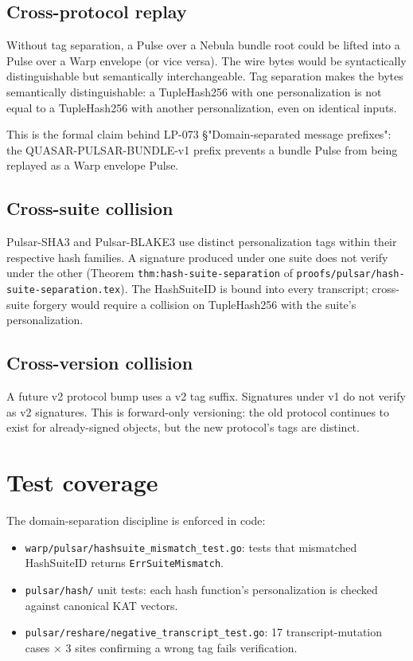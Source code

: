 \documentclass[11pt,a4paper]{article}
\begin{document}
\subsection{Cross-protocol replay}

Without tag separation, a Pulse over a Nebula bundle root could be lifted into a Pulse over a Warp envelope (or vice versa). The wire bytes would be syntactically distinguishable but semantically interchangeable. Tag separation makes the bytes semantically distinguishable: a TupleHash256 with one personalization is not equal to a TupleHash256 with another personalization, even on identical inputs.

This is the formal claim behind LP-073 \cite{luxpulsar} \S "Domain-separated message prefixes": the QUASAR-PULSAR-BUNDLE-v1 prefix prevents a bundle Pulse from being replayed as a Warp envelope Pulse.

\subsection{Cross-suite collision}

Pulsar-SHA3 and Pulsar-BLAKE3 use distinct personalization tags within their respective hash families. A signature produced under one suite does not verify under the other (Theorem \texttt{thm:hash-suite-separation} of \texttt{proofs/pulsar/hash-suite-separation.tex}). The HashSuiteID is bound into every transcript; cross-suite forgery would require a collision on TupleHash256 with the suite's personalization.

\subsection{Cross-version collision}

A future v2 protocol bump uses a v2 tag suffix. Signatures under v1 do not verify as v2 signatures. This is forward-only versioning: the old protocol continues to exist for already-signed objects, but the new protocol's tags are distinct.

\section{Test coverage}

The domain-separation discipline is enforced in code:

\begin{itemize}[leftmargin=2em,nosep]
  \item \texttt{warp/pulsar/hashsuite\_mismatch\_test.go}: tests that mismatched HashSuiteID returns \texttt{ErrSuiteMismatch}.
  \item \texttt{pulsar/hash/} unit tests: each hash function's personalization is checked against canonical KAT vectors.
  \item \texttt{pulsar/reshare/negative\_transcript\_test.go}: 17 transcript-mutation cases × 3 sites confirming a wrong tag fails verification.
\end{itemize}
\end{document}
